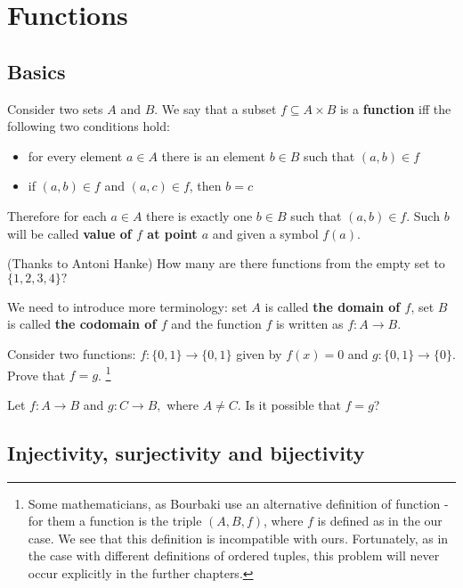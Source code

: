 \section{Functions}
\label{sec:intro_to_functions}

\subsection{Basics}
\noindent Consider two sets $A$ and $B$. We say that a subset $f\subseteq A\times B$ is a \textbf{function}
iff the following two conditions hold:
\begin{itemize}
	\item for every element $a\in A$ there is an element $b\in B$ such that $(a,b)\in f$
	\item if $(a,b)\in f$ and $(a,c)\in f$, then $b=c$
\end{itemize}
Therefore for each $a\in A$ there is exactly one $b\in B$ such that $(a,b)\in f$. Such $b$ will be called
\textbf{value of $f$ at point $a$} and given a symbol $f(a).$
\begin{prob}
	(Thanks to Antoni Hanke) How many are there functions from the empty set to $\{1,2,3,4\}?$
\end{prob}

We need to introduce more terminology: set $A$ is called \textbf{the domain of $f$}, set $B$ is called
\textbf{the codomain of $f$} and the function $f$ is written as $f: A\to B$.

\begin{prob}
	Consider two functions: $f:\{0, 1\}\to \{0,1\}$ given by $f(x)=0$ and $g:\{0,1\}\to\{0\}$.
	Prove that $f=g$.
	\footnote{Some mathematicians, as Bourbaki use an alternative definition of function - for them
	a function is the triple $(A,B,f)$, where $f$ is defined as in the our case. We see that this definition
	is incompatible with ours. Fortunately, as in the case with different definitions of ordered tuples, 
	this problem will never occur explicitly in the further chapters.}
\end{prob}

\begin{prob}
	Let $f:A\to B$ and $g: C\to B,$ where $A\neq C$. Is it possible that $f=g$?
\end{prob}

\subsection{Injectivity, surjectivity and bijectivity}

